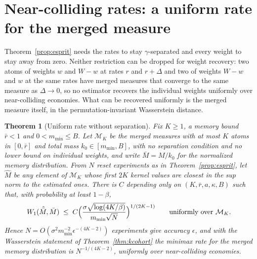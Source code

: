 \documentclass[12pt]{article}
\newtheorem{theorem}{Theorem}[section]
\theoremstyle{definition}
\theoremstyle{remark}
\begin{document}
\section{Near-colliding rates: a uniform rate for the merged measure}\label{sec:uniform}

Theorem~\ref{prop:esprit} needs the rates to stay $\gamma$-separated and every weight to stay away from zero. Neither restriction can be dropped for weight recovery: two atoms of weights $w$ and $W-w$ at rates $r$ and $r+\Delta$ and two of weights $W-w$ and $w$ at the same rates have merged measures that converge to the same measure as $\Delta\to0$, so no estimator recovers the individual weights uniformly over near-colliding economies. What can be recovered uniformly is the merged measure itself, in the permutation-invariant Wasserstein distance.

\begin{theorem}[Uniform rate without separation]\label{thm:uniformw1}
Fix $K\ge1$, a memory bound $\bar r<1$ and $0<m_{\min}\le B$. Let $\mathcal M_K$ be the merged measures with at most $K$ atoms in $[0,\bar r]$ and total mass $k_0\in[m_{\min},B]$, with no separation condition and no lower bound on individual weights, and write $\bar M=M/k_0$ for the normalized memory distribution. From $N$ reset experiments as in Theorem~\ref{prop:esprit}, let $\hat M$ be any element of $\mathcal M_K$ whose first $2K$ kernel values are closest in the sup norm to the estimated ones. There is $C$ depending only on $(K,\bar r,a,\kappa,B)$ such that, with probability at least $1-\beta$,
\[
W_1(\hat{\bar M},\bar M)\;\le\;C\Bigl(\frac{\sigma\sqrt{\log(4K/\beta)}}{m_{\min}\sqrt N}\Bigr)^{1/(2K-1)}\qquad\text{uniformly over }\mathcal M_K .
\]
Hence $N=O(\sigma^2m_{\min}^{-2}\epsilon^{-(4K-2)})$ experiments give accuracy $\epsilon$, and with the Wasserstein statement of Theorem~\ref{thm:kcohort} the minimax rate for the merged memory distribution is $N^{-1/(4K-2)}$, uniformly over near-colliding economies.
\end{theorem}
\end{document}

